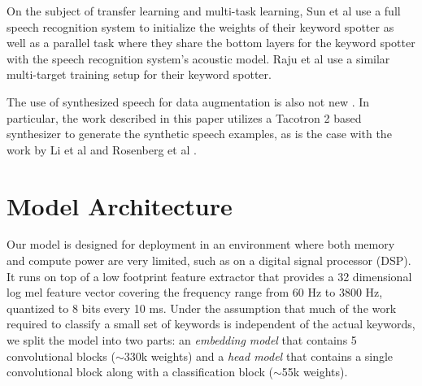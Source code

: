 \documentclass{article}
\begin{document}
On the subject of transfer learning and multi-task learning, Sun et al \cite{Sun2017CompressedTD} use a full speech recognition system to initialize the weights of their keyword spotter as well as a parallel task where they share the bottom layers for the keyword spotter with the speech recognition system's acoustic model. Raju et al \cite{raju2018data} use a similar multi-target training setup for their keyword spotter.







The use of synthesized speech for data augmentation is also not new \cite{rygaard2015using, li2018training, rosenberg2019speech, Mimura2018LeveragingSS}. In particular, the work described in this paper utilizes a Tacotron 2 \cite{Shen_2018} based synthesizer to generate the synthetic speech examples, as is the case with the work by Li et al \cite{li2018training} and Rosenberg et al \cite{rosenberg2019speech}.





















\section{Model Architecture}
\label{sec:model_architecture}
Our model is designed for deployment 
in an environment where both memory and compute power are very limited, such as on a digital signal processor (DSP). It runs on top of a low footprint feature extractor that provides a 32 dimensional log mel feature vector covering the frequency range from 60 Hz to 3800 Hz, quantized to 8 bits every 10 ms. Under the assumption that much of the work required to classify a small set of keywords is independent of the actual keywords, we split the model into two parts: an \textit{embedding model} that contains 5 convolutional blocks ($\sim$330k weights) and a \textit{head model} that contains a single convolutional block along with a classification block ($\sim$55k weights).
\end{document}
